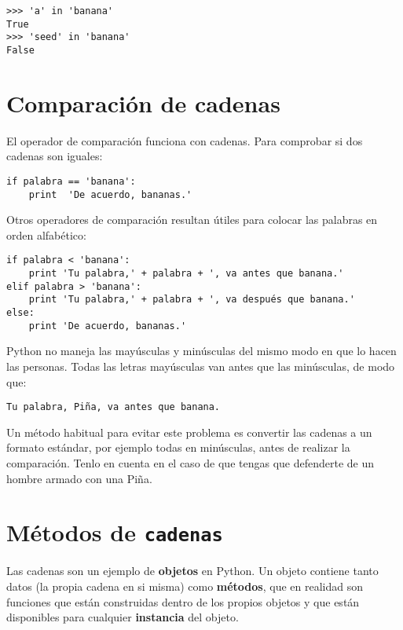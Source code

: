 \beforeverb
\begin{verbatim}
>>> 'a' in 'banana'
True
>>> 'seed' in 'banana'
False
\end{verbatim}
\afterverb
%

\section{Comparación de cadenas}


El operador de comparación funciona con cadenas. Para comprobar si dos cadenas son iguales:

\beforeverb
\begin{verbatim}
if palabra == 'banana':
    print  'De acuerdo, bananas.'
\end{verbatim}
\afterverb
%
Otros operadores de comparación resultan útiles para colocar las palabras en orden
alfabético:

\beforeverb
\begin{verbatim}
if palabra < 'banana':
    print 'Tu palabra,' + palabra + ', va antes que banana.'
elif palabra > 'banana':
    print 'Tu palabra,' + palabra + ', va después que banana.'
else:
    print 'De acuerdo, bananas.'
\end{verbatim}
\afterverb
%
Python no maneja las mayúsculas y minúsculas del mismo modo en que
lo hacen las personas. Todas las letras mayúsculas van antes que las
minúsculas, de modo que:

\beforeverb
\begin{verbatim}
Tu palabra, Piña, va antes que banana.
\end{verbatim}
\afterverb
%
Un método habitual para evitar este problema es convertir las cadenas
a un formato estándar, por ejemplo todas en minúsculas, antes de realizar la
comparación. Tenlo en cuenta en el caso de que tengas que defenderte
de un hombre armado con una Piña.


\section{Métodos de {\tt cadenas}}

Las cadenas son un ejemplo de {\bf objetos} en Python. Un objeto contiene
tanto datos (la propia cadena en si misma) como {\bf métodos}, que
en realidad son funciones que están construidas dentro de los propios objetos y
que están disponibles para cualquier {\bf instancia} del objeto.

